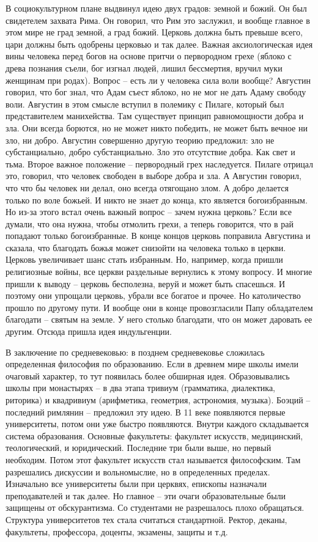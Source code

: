 \documentclass[a4paper, 12pt]{article}
\begin{document}
В социокультурном плане выдвинул идею двух градов: земной и божий. Он был свидетелем захвата Рима. Он говорил, что Рим это заслужил, и вообще главное в этом мире не град земной, а град божий. Церковь должна быть превыше всего, цари должны быть одобрены церковью и так далее. Важная аксиологическая идея вины человека перед богов на основе притчи о первородном грехе (яблоко с древа познания съели, бог изгнал людей, лишил бессмертия, вручил муки женщинам при родах). Вопрос -- есть ли у человека сила воли вообще? Августин говорил, что бог знал, что Адам съест яблоко, но не мог не дать Адаму свободу воли. Августин в этом смысле вступил в полемику с Пилаге, который был представителем манихейства. Там существует принцип равномощности добра и зла. Они всегда борются, но не может никто победить, не может быть вечное ни зло, ни добро. Августин совершенно другую теорию предложил: зло не субстанциально, добро субстанциально. Зло это отсутствие добра. Как свет и тьма. Второе важное положение -- первородный грех наследуется. Пилаге отрицал это, говорил, что человек свободен в выборе добра и зла. А Августин говорил, что что бы человек ни делал, оно всегда отягощано злом. А добро делается только по воле божьей. И никто не знает до конца, кто является богоизбранным. Но из-за этого встал очень важный вопрос -- зачем нужна церковь? Если все думали, что она нужна, чтобы отмолить грехи, а теперь говорится, что в рай попадают только богоизбранные. В конце концов церковь поправила Августина и сказала, что благодать божья может снизойти на человека только в церкви. Церковь увеличивает шанс стать избранным. Но, например, когда пришли религиозные войны, все церкви раздельные вернулись к этому вопросу. И многие пришли к выводу -- церковь бесполезна, веруй и может быть спасешься. И поэтому они упрощали церковь, убрали все богатое и прочее. Но католичество прошло по другому пути. И вообще они в конце провозгласили Папу обладателем благодати -- святым на земле. У него столько благодати, что он может даровать ее другим. Отсюда пришла идея индульгенции. 

В заключение по средневековью: в позднем средневековье сложилась определенная философия по образованию. Если в древнем мире школы имели очаговый характер, то тут появилась более обширная идея. Образовывались школы при монастырях -- в два этапа тривиум (грамматика, диалектика, риторика) и квадривиум (арифметика, геометрия, астрономия, музыка). Боэций -- последний римлянин -- предложил эту идею. В 11 веке появляются первые университеты, потом они уже быстро появляются. Внутри каждого складывается система образования. Основные факультеты: факультет искусств, медицинский, теологический, и юридический. Последние три были выше, но первый необходим. Потом этот факультет искусств стал называется философским. Там разрешались дискуссии и вольномыслие, но в определенных пределах. Изначально все университеты были при церквях, епископы назначали преподавателей и так далее. Но главное -- эти очаги образовательные были защищены от обскурантизма. Со студентами не разрешалось плохо обращаться. Структура университетов тех стала считаться стандартной. Ректор, деканы, факультеты, профессора, доценты, экзамены, защиты и т.д. 
\end{document}
